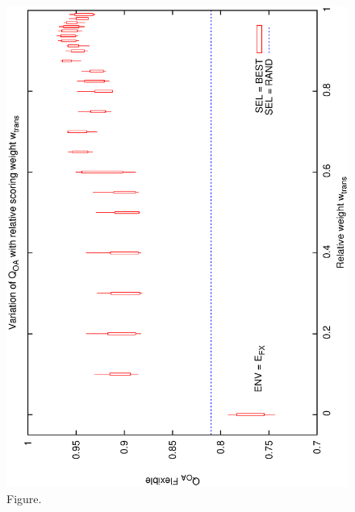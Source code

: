 \documentclass[12pt,a4paper]{article}
\begin{document}
\begin{figure}[htbp]
 \begin{center}
  \includegraphics[scale=1.0, angle=0]{figures/cs1_dw2_foa.eps}
 \end{center}
  \caption[Figure.]
{Figure.}
\end{figure}
\clearpage
\end{document}
